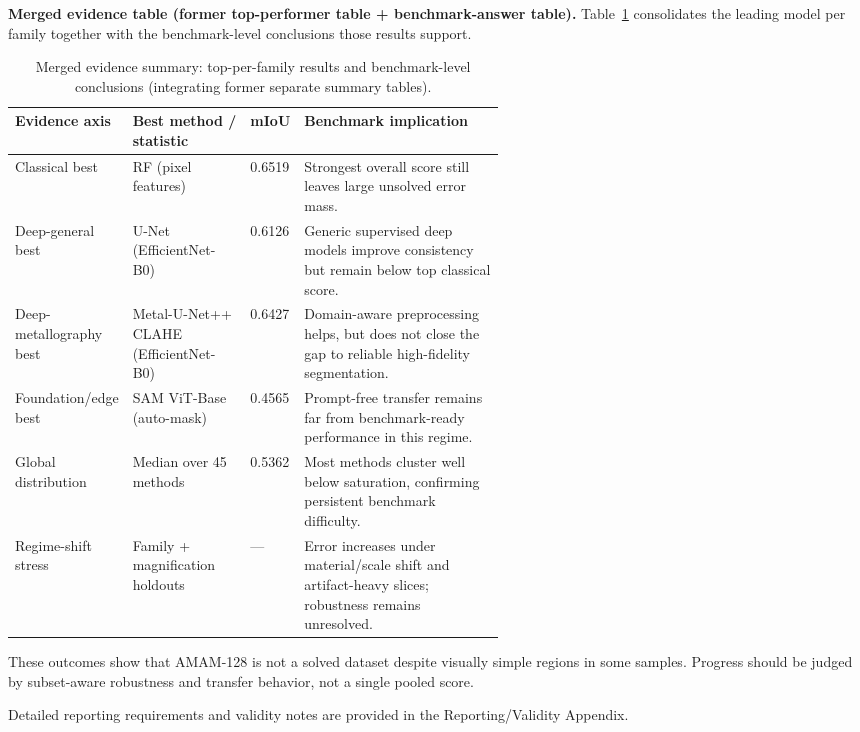 \documentclass{article}
\newcommand{\tablefontsize}{\small}
\begin{document}
\textbf{Merged evidence table (former top-performer table + benchmark-answer table).} Table~\ref{tab:merged_main_evidence} consolidates the leading model per family together with the benchmark-level conclusions those results support.
\begin{table}[H]
    \centering
    \tablefontsize
    \caption{Merged evidence summary: top-per-family results and benchmark-level conclusions (integrating former separate summary tables).}
    \label{tab:merged_main_evidence}
    \setlength{\tabcolsep}{3pt}
    \begin{tabularx}{\linewidth}{p{0.24\linewidth}p{0.24\linewidth}p{0.09\linewidth}X}
        \toprule
        Evidence axis & Best method / statistic & mIoU & Benchmark implication \\
        \midrule
        Classical best & RF (pixel features) & 0.6519 & Strongest overall score still leaves large unsolved error mass. \\
        Deep-general best & U-Net (EfficientNet-B0) & 0.6126 & Generic supervised deep models improve consistency but remain below top classical score. \\
        Deep-metallography best & Metal-U-Net++ CLAHE (EfficientNet-B0) & 0.6427 & Domain-aware preprocessing helps, but does not close the gap to reliable high-fidelity segmentation. \\
        Foundation/edge best & SAM ViT-Base (auto-mask) & 0.4565 & Prompt-free transfer remains far from benchmark-ready performance in this regime. \\
        Global distribution & Median over 45 methods & 0.5362 & Most methods cluster well below saturation, confirming persistent benchmark difficulty. \\
        Regime-shift stress & Family + magnification holdouts & --- & Error increases under material/scale shift and artifact-heavy slices; robustness remains unresolved. \\
        \bottomrule
    \end{tabularx}
\end{table}

These outcomes show that AMAM-128 is not a solved dataset despite visually simple regions in some samples. Progress should be judged by subset-aware robustness and transfer behavior, not a single pooled score.

Detailed reporting requirements and validity notes are provided in the Reporting/Validity Appendix.

\FloatBarrier
\clearpage


\end{document}
